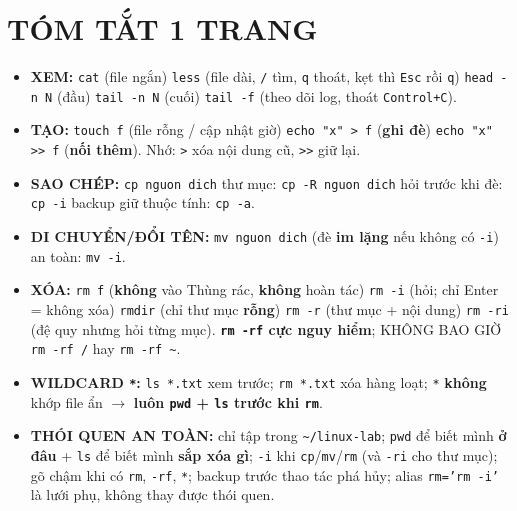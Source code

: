 \documentclass[12pt,a4paper]{article}
\newcommand{\cmd}[1]{\texttt{#1}}
\begin{document}
\section{TÓM TẮT 1 TRANG}

\begin{itemize}[leftmargin=1.4em]
\item \textbf{XEM:} \cmd{cat} (file ngắn) \textperiodcentered{} \cmd{less} (file dài, \cmd{/} tìm, \cmd{q} thoát, kẹt thì \cmd{Esc} rồi \cmd{q}) \textperiodcentered{} \cmd{head -n N} (đầu) \textperiodcentered{} \cmd{tail -n N} (cuối) \textperiodcentered{} \cmd{tail -f} (theo dõi log, thoát \cmd{Control+C}).
\item \textbf{TẠO:} \cmd{touch f} (file rỗng / cập nhật giờ) \textperiodcentered{} \cmd{echo "x" > f} (\textbf{ghi đè}) \textperiodcentered{} \cmd{echo "x" >> f} (\textbf{nối thêm}). Nhớ: \cmd{>} xóa nội dung cũ, \cmd{>>} giữ lại.
\item \textbf{SAO CHÉP:} \cmd{cp nguon dich} \textperiodcentered{} thư mục: \cmd{cp -R nguon dich} \textperiodcentered{} hỏi trước khi đè: \cmd{cp -i} \textperiodcentered{} backup giữ thuộc tính: \cmd{cp -a}.
\item \textbf{DI CHUYỂN/ĐỔI TÊN:} \cmd{mv nguon dich} (đè \textbf{im lặng} nếu không có \cmd{-i}) \textperiodcentered{} an toàn: \cmd{mv -i}.
\item \textbf{XÓA:} \cmd{rm f} (\textbf{không} vào Thùng rác, \textbf{không} hoàn tác) \textperiodcentered{} \cmd{rm -i} (hỏi; chỉ Enter = không xóa) \textperiodcentered{} \cmd{rmdir} (chỉ thư mục \textbf{rỗng}) \textperiodcentered{} \cmd{rm -r} (thư mục + nội dung) \textperiodcentered{} \cmd{rm -ri} (đệ quy nhưng hỏi từng mục). \textbf{\cmd{rm -rf} cực nguy hiểm}; KHÔNG BAO GIỜ \cmd{rm -rf /} hay \cmd{rm -rf \textasciitilde{}}.
\item \textbf{WILDCARD \cmd{*}:} \cmd{ls *.txt} xem trước; \cmd{rm *.txt} xóa hàng loạt; \cmd{*} \textbf{không} khớp file ẩn $\rightarrow$ \textbf{luôn \cmd{pwd} + \cmd{ls} trước khi \cmd{rm}}.
\item \textbf{THÓI QUEN AN TOÀN:} chỉ tập trong \cmd{\textasciitilde/linux-lab}; \cmd{pwd} để biết mình \textbf{ở đâu} + \cmd{ls} để biết mình \textbf{sắp xóa gì}; \cmd{-i} khi \cmd{cp}/\cmd{mv}/\cmd{rm} (và \cmd{-ri} cho thư mục); gõ chậm khi có \cmd{rm}, \cmd{-rf}, \cmd{*}; backup trước thao tác phá hủy; alias \cmd{rm='rm -i'} là lưới phụ, không thay được thói quen.
\end{itemize}
\end{document}
